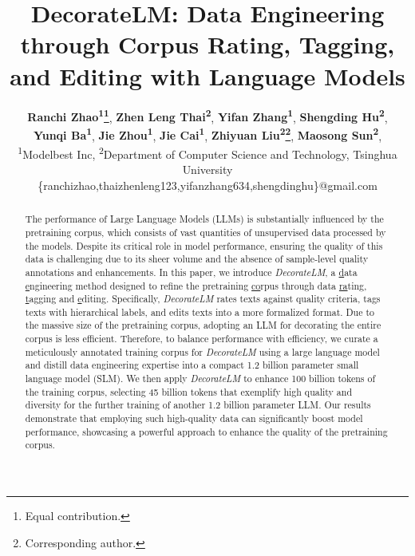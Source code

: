 \documentclass[11pt]{article}
\title{DecorateLM: Data Engineering through Corpus Rating, Tagging, and Editing with Language Models}
\author{
 \textbf{Ranchi Zhao\textsuperscript{1}\thanks{Equal contribution.}},
 \textbf{Zhen Leng Thai\textsuperscript{2}\footnotemark[1]},
 \textbf{Yifan Zhang\textsuperscript{1}\footnotemark[1]},
 \textbf{Shengding Hu\textsuperscript{2}\footnotemark[1]},
\\
 \textbf{Yunqi Ba\textsuperscript{1}},
 \textbf{Jie Zhou\textsuperscript{1}},
 \textbf{Jie Cai\textsuperscript{1}},
 \textbf{Zhiyuan Liu\textsuperscript{2}\thanks{Corresponding author.}},
 \textbf{Maosong Sun\textsuperscript{2}\footnotemark[2]},
\\
 \textsuperscript{1}Modelbest Inc,
 \textsuperscript{2}Department of Computer Science and Technology, Tsinghua University
\\
\{ranchizhao,thaizhenleng123,yifanzhang634,shengdinghu\}@gmail.com
}
\begin{document}
\maketitle
\begin{abstract}
The performance of Large Language Models (LLMs) is substantially influenced by the pretraining corpus, which consists of vast quantities of unsupervised data processed by the models. Despite its critical role in model performance, ensuring the quality of this data is challenging due to its sheer volume and the absence of sample-level quality annotations and enhancements. In this paper, we introduce \textit{DecorateLM}, a \underline{d}ata \underline{e}ngineering method designed to refine the pretraining \underline{co}rpus through data \underline{ra}ting, \underline{t}agging and \underline{e}diting. Specifically, \textit{DecorateLM}  rates texts against quality criteria, tags texts with hierarchical labels, and edits texts into a more formalized format. Due to the massive size of the pretraining corpus, adopting an LLM for decorating the entire corpus is less efficient. Therefore, to balance performance with efficiency, we curate a meticulously annotated training corpus for \textit{DecorateLM} using a large language model and distill data engineering expertise into a compact 1.2 billion parameter small language model (SLM). We then apply \textit{DecorateLM} to enhance 100 billion tokens of the training corpus, selecting 45 billion tokens that exemplify high quality and diversity for the further training of another 1.2 billion parameter LLM. Our results demonstrate that employing such high-quality data can significantly boost model performance, showcasing a powerful approach to enhance the quality of the pretraining corpus.
\end{abstract}
\end{document}

